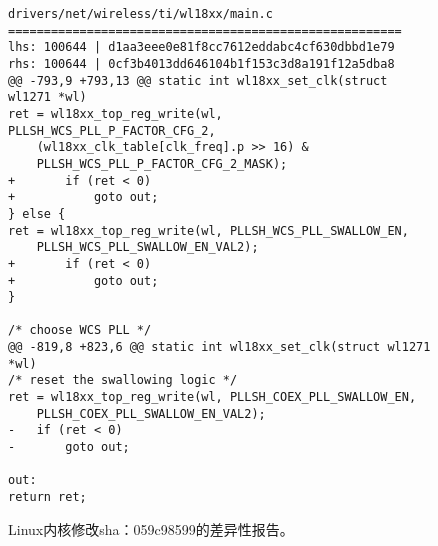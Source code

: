 \begin{figure}
	\centering
\begin{lstlisting}
drivers/net/wireless/ti/wl18xx/main.c
=======================================================
lhs: 100644 | d1aa3eee0e81f8cc7612eddabc4cf630dbbd1e79
rhs: 100644 | 0cf3b4013dd646104b1f153c3d8a191f12a5dba8
@@ -793,9 +793,13 @@ static int wl18xx_set_clk(struct wl1271 *wl)
ret = wl18xx_top_reg_write(wl, PLLSH_WCS_PLL_P_FACTOR_CFG_2,
	(wl18xx_clk_table[clk_freq].p >> 16) &
	PLLSH_WCS_PLL_P_FACTOR_CFG_2_MASK);
+		if (ret < 0)
+			goto out;
} else {
ret = wl18xx_top_reg_write(wl, PLLSH_WCS_PLL_SWALLOW_EN,
	PLLSH_WCS_PLL_SWALLOW_EN_VAL2);
+		if (ret < 0)
+			goto out;
}

/* choose WCS PLL */
@@ -819,8 +823,6 @@ static int wl18xx_set_clk(struct wl1271 *wl)
/* reset the swallowing logic */
ret = wl18xx_top_reg_write(wl, PLLSH_COEX_PLL_SWALLOW_EN,
	PLLSH_COEX_PLL_SWALLOW_EN_VAL2);
-	if (ret < 0)
-		goto out;

out:
return ret;

\end{lstlisting}
	\caption{
	Linux内核修改sha：059c98599的差异性报告。
	}
	\label{fig:2-3-diff}
\end{figure}